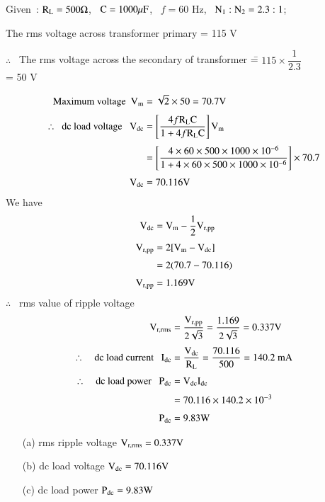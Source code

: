 \begin{solution}
Given~: $\textrm{R}_{\textrm{L}}=500\Omega$,  \ $\textrm{C}=1000\mu\textrm{F}$, \ $f=60$ Hz, \ $\textrm{N}_{1}:\textrm{N}_{2}=2.3:1$;

The rms voltage across transformer primary = 115 V

\begin{tabbing}
$\therefore$~ The rms voltage across the secondary of transformer \== $115\times \dfrac{1}{2.3}$\\[5pt]
\>= 50 V
\end{tabbing}
\begin{align*}
\text{Maximum voltage~~} \textrm{V}_{\textrm{m}} &= \sqrt{2}\times 50=70.7\textrm{V}\\[3pt]
\therefore~~ \text{dc load voltage~~ } \textrm{V}_{\text{dc}} &= \left[\frac{4f\textrm{R}_{\textrm{L}}\textrm{C}}{1+4f\textrm{R}_{\textrm{L}}\textrm{C}}\right]\textrm{V}_{\textrm{m}}\\[3pt]
&= \left[\frac{4\times 60\times 500\times 1000\times 10^{-6}}{1+4\times 60\times 500\times 1000\times 10^{-6}}\right]\times 70.7\\[3pt]
\textrm{V}_{\text{dc}} &= 70.116\textrm{V}
\end{align*}
We have
\begin{align*}
\textrm{V}_{\text{dc}} &= \textrm{V}_{\textrm{m}}-\frac{1}{2}\textrm{V}_{\text{r,pp}}\\[3pt]
\textrm{V}_{\text{r,pp}} &= 2[\textrm{V}_{\textrm{m}}-\textrm{V}_{\text{dc}}]\\[3pt]
&= 2(70.7-70.116)\\[3pt]
\textrm{V}_{\text{r,pp}} &= 1.169\textrm{V}
\end{align*}
$\therefore$~ rms value of ripple voltage
\begin{align*}
\textrm{V}_{\text{r,rms}} &= \frac{\textrm{V}_{\text{r,pp}}}{2\sqrt{3}}=\dfrac{1.169}{2\sqrt{3}}=0.337\textrm{V}\\[3pt]
\therefore\quad \text{dc load current~~ } \textrm{I}_{\text{dc}} &= \frac{\textrm{V}_{\text{dc}}}{\textrm{R}_{\textrm{L}}}=\dfrac{70.116}{500}=140.2\text{~mA}\\[3pt]
\therefore\quad \text{dc load power~~ } \textrm{P}_{\text{dc}} &= \textrm{V}_{\text{dc}}\textrm{I}_{\text{dc}}\\[3pt]
&= 70.116\times 140.2\times 10^{-3}\\[3pt]
\textrm{P}_{\text{dc}} &= 9.83\textrm{W}
\end{align*}
\begin{itemize}
\item[(a)] rms ripple voltage $\textrm{V}_{\text{r,rms}}=0.337\textrm{V}$

\item[(b)] dc load voltage $\textrm{V}_{\text{dc}}=70.116\textrm{V}$

\item[(c)] dc load power $\textrm{P}_{\text{dc}}=9.83\textrm{W}$
\end{itemize}
\end{solution}

